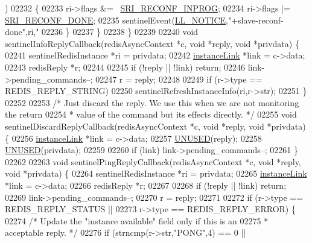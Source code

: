 \begin{DoxyCode}
{{{{{{{{{{{{{{{{{{{{{{{{{{{{{{{{{{{{{{{{{{{{{{{      )
02232         \{
02233             ri->flags &= ~\hyperlink{sentinel_8c_a58c89f4aaa1bdfde4c25e3bb476c35aa}{SRI\_RECONF\_INPROG};
02234             ri->flags |= \hyperlink{sentinel_8c_adb468d0a8c96c954b6af26aa670d7a11}{SRI\_RECONF\_DONE};
02235             sentinelEvent(\hyperlink{server_8h_a8c54c191e436c7dd3012167212692401}{LL\_NOTICE},\textcolor{stringliteral}{"+slave-reconf-done"},ri,\textcolor{stringliteral}{"%
02236         \}
02237     \}
02238 \}
02239 
02240 \textcolor{keywordtype}{void} sentinelInfoReplyCallback(redisAsyncContext *c, \textcolor{keywordtype}{void} *reply, \textcolor{keywordtype}{void} *privdata) \{
02241     sentinelRedisInstance *ri = privdata;
02242     \hyperlink{structinstanceLink}{instanceLink} *link = c->data;
02243     redisReply *r;
02244 
02245     \textcolor{keywordflow}{if} (!reply || !link) \textcolor{keywordflow}{return};
02246     link->pending\_commands--;
02247     r = reply;
02248 
02249     \textcolor{keywordflow}{if} (r->type == REDIS\_REPLY\_STRING)
02250         sentinelRefreshInstanceInfo(ri,r->str);
02251 \}
02252 
02253 \textcolor{comment}{/* Just discard the reply. We use this when we are not monitoring the return}
02254 \textcolor{comment}{ * value of the command but its effects directly. */}
02255 \textcolor{keywordtype}{void} sentinelDiscardReplyCallback(redisAsyncContext *c, \textcolor{keywordtype}{void} *reply, \textcolor{keywordtype}{void} *privdata) \{
02256     \hyperlink{structinstanceLink}{instanceLink} *link = c->data;
02257     \hyperlink{server_8h_ae7c9dc8f13568a9c856573751f1ee1ec}{UNUSED}(reply);
02258     \hyperlink{server_8h_ae7c9dc8f13568a9c856573751f1ee1ec}{UNUSED}(privdata);
02259 
02260     \textcolor{keywordflow}{if} (link) link->pending\_commands--;
02261 \}
02262 
02263 \textcolor{keywordtype}{void} sentinelPingReplyCallback(redisAsyncContext *c, \textcolor{keywordtype}{void} *reply, \textcolor{keywordtype}{void} *privdata) \{
02264     sentinelRedisInstance *ri = privdata;
02265     \hyperlink{structinstanceLink}{instanceLink} *link = c->data;
02266     redisReply *r;
02267 
02268     \textcolor{keywordflow}{if} (!reply || !link) \textcolor{keywordflow}{return};
02269     link->pending\_commands--;
02270     r = reply;
02271 
02272     \textcolor{keywordflow}{if} (r->type == REDIS\_REPLY\_STATUS ||
02273         r->type == REDIS\_REPLY\_ERROR) \{
02274         \textcolor{comment}{/* Update the "instance available" field only if this is an}
02275 \textcolor{comment}{         * acceptable reply. */}
02276         \textcolor{keywordflow}{if} (strncmp(r->str,\textcolor{stringliteral}{"PONG"},4) == 0 ||
}}}}}}}}}}}}}}}}}}}}}}}}}}}}}}}}}}}}}}}}}}}}}}}}
\end{DoxyCode}
